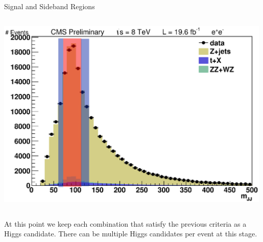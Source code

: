 \begin{frame}{Signal and Sideband Regions}
\begin{columns}
\begin{column}{0.4\textwidth}
      \includegraphics[width=0.99\textwidth]{images/mJJ_signal_sideband.eps}
    \end{column}
  \end{columns}
\begin{center}
\footnotesize
 At this point we keep each combination that satisfy the previous criteria as a Higgs candidate.  There can be multiple Higgs candidates per event at this stage.
  \end{center}
\end{frame}


